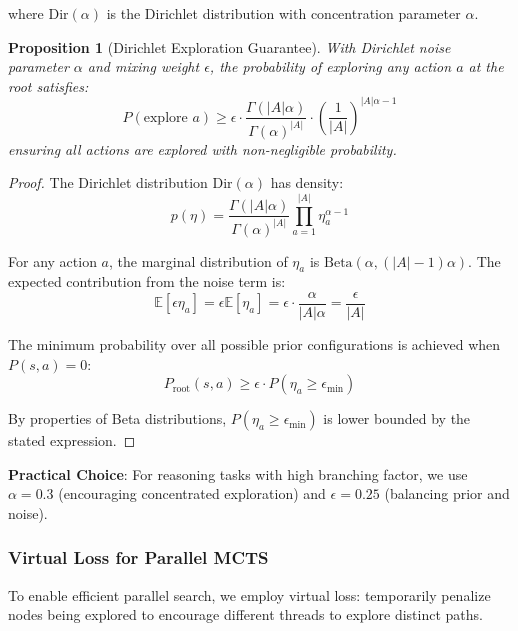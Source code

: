 \documentclass[11pt,a4paper]{article}
\newtheorem{proposition}[theorem]{Proposition}
\newcommand{\E}{\mathbb{E}}
\begin{document}
where $\text{Dir}(\alpha)$ is the Dirichlet distribution with concentration parameter $\alpha$.

\begin{proposition}[Dirichlet Exploration Guarantee]
\label{prop:dirichlet}
With Dirichlet noise parameter $\alpha$ and mixing weight $\epsilon$, the probability of exploring any action $a$ at the root satisfies:
\begin{equation}
    P(\text{explore } a) \geq \epsilon \cdot \frac{\Gamma(|A|\alpha)}{\Gamma(\alpha)^{|A|}} \cdot \left(\frac{1}{|A|}\right)^{|A|\alpha - 1}
\end{equation}
ensuring all actions are explored with non-negligible probability.
\end{proposition}

\begin{proof}
The Dirichlet distribution $\text{Dir}(\alpha)$ has density:
\begin{equation}
    p(\eta) = \frac{\Gamma(|A|\alpha)}{\Gamma(\alpha)^{|A|}} \prod_{a=1}^{|A|} \eta_a^{\alpha-1}
\end{equation}

For any action $a$, the marginal distribution of $\eta_a$ is $\text{Beta}(\alpha, (|A|-1)\alpha)$. The expected contribution from the noise term is:
\begin{equation}
    \E[\epsilon \eta_a] = \epsilon \E[\eta_a] = \epsilon \cdot \frac{\alpha}{|A|\alpha} = \frac{\epsilon}{|A|}
\end{equation}

The minimum probability over all possible prior configurations is achieved when $P(s,a) = 0$:
\begin{equation}
    P_{\text{root}}(s,a) \geq \epsilon \cdot P(\eta_a \geq \epsilon_{\min})
\end{equation}

By properties of Beta distributions, $P(\eta_a \geq \epsilon_{\min})$ is lower bounded by the stated expression.
\end{proof}

\textbf{Practical Choice}: For reasoning tasks with high branching factor, we use $\alpha = 0.3$ (encouraging concentrated exploration) and $\epsilon = 0.25$ (balancing prior and noise).

\subsubsection{Virtual Loss for Parallel MCTS}

To enable efficient parallel search, we employ virtual loss: temporarily penalize nodes being explored to encourage different threads to explore distinct paths.
\end{document}
